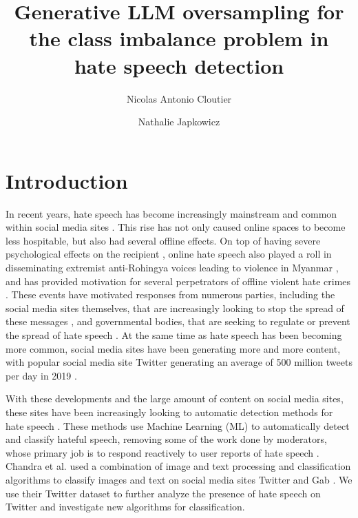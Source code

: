 \documentclass[runningheads]{llncs}
\begin{document}
\title{Generative LLM oversampling for the class imbalance problem in hate speech detection}
\author{Nicolas Antonio Cloutier \and Nathalie Japkowicz}



\maketitle 

\begin{abstract}

\end{abstract}

\section{Introduction}
In recent years, hate speech has become increasingly mainstream and common within social media sites \cite{siegel}. This rise has not only caused online spaces to become less hospitable, but also had several offline effects. On top of having severe psychological effects on the recipient \cite{siegel}, online hate speech also played a roll in disseminating extremist anti-Rohingya voices leading to violence in Myanmar \cite{green}, and has provided motivation for several perpetrators of offline violent hate crimes \cite{siegel}. These events have motivated responses from numerous parties, including the social media sites themselves, that are increasingly looking to stop the spread of these messages \cite{ullmann}, and governmental bodies, that are seeking to regulate or prevent the spread of hate speech \cite{banks}. At the same time as hate speech has been becoming more common, social media sites have been generating more and more content, with popular social media site Twitter generating an average of 500 million tweets per day in 2019 \cite{pereira}.

With these developments and the large amount of content on social media sites, these sites have been increasingly looking to automatic detection methods for hate speech \cite{ullmann}. These methods use Machine Learning (ML) to automatically detect and classify hateful speech, removing some of the work done by moderators, whose primary job is to respond reactively to user reports of hate speech \cite{ullmann}. Chandra et al. \cite{chandra} used a combination of image and text processing and classification algorithms to classify images and text on social media sites Twitter and Gab \cite{chandra}. We use their Twitter dataset to further analyze the presence of hate speech on Twitter and investigate new algorithms for classification.
\end{document}
